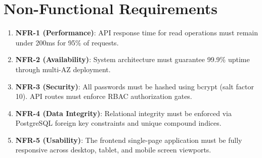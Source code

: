 \section{Non-Functional Requirements}
\begin{enumerate}
    \item \textbf{NFR-1 (Performance)}: API response time for read operations must remain under 200ms for 95\% of requests.
    \item \textbf{NFR-2 (Availability)}: System architecture must guarantee 99.9\% uptime through multi-AZ deployment.
    \item \textbf{NFR-3 (Security)}: All passwords must be hashed using bcrypt (salt factor 10). API routes must enforce RBAC authorization gates.
    \item \textbf{NFR-4 (Data Integrity)}: Relational integrity must be enforced via PostgreSQL foreign key constraints and unique compound indices.
    \item \textbf{NFR-5 (Usability)}: The frontend single-page application must be fully responsive across desktop, tablet, and mobile screen viewports.
\end{enumerate}
